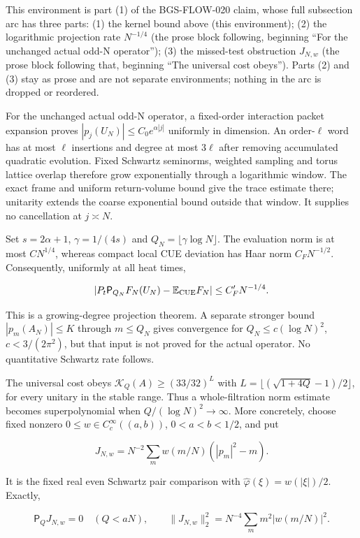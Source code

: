 This environment is part (1) of the BGS-FLOW-020 claim, whose full
subsection arc has three parts: (1) the kernel bound above (this
environment); (2) the logarithmic projection rate \(N^{-1/4}\) (the prose
block following, beginning ``For the unchanged actual odd-N
operator''); (3) the missed-test obstruction \(J_{N,w}\) (the prose
block following that, beginning ``The universal cost obeys''). Parts
(2) and (3) stay as prose and are not separate environments; nothing
in the arc is dropped or reordered.

For the unchanged actual odd-N operator, a fixed-order interaction
packet expansion proves \(|p_j(U_N)|\le C_0e^{\alpha|j|}\) uniformly
in dimension. An order-\(\ell\) word has at most \(\ell\) insertions and
degree at most \(3\ell\) after removing accumulated quadratic evolution.
Fixed Schwartz seminorms, weighted sampling and torus lattice overlap
therefore grow exponentially through a logarithmic window. The exact
frame and uniform return-volume bound give the trace estimate there;
unitarity extends the coarse exponential bound outside that window.
It supplies no cancellation at \(j\asymp N\).

Set \(s=2\alpha+1\), \(\gamma=1/(4s)\) and
\(Q_N=\lfloor\gamma\log N\rfloor\). The evaluation norm is at most
\(CN^{1/4}\), whereas compact local CUE deviation has Haar norm
\(C_FN^{-1/2}\). Consequently, uniformly at all heat times,

\[
|P_t\mathsf P_{Q_N}F_N(U_N)-\mathbb E_{\rm CUE}F_N|
\le C'_FN^{-1/4}.
\]

This is a growing-degree projection theorem. A separate stronger bound
\(|p_m(A_N)|\le K\) through \(m\le Q_N\) gives convergence for
\(Q_N\le c(\log N)^2\), \(c<3/(2\pi^2)\), but that input is not
proved for the actual operator. No quantitative Schwartz rate follows.

The universal cost obeys
\(\mathcal K_Q(A)\ge(33/32)^L\) with
\(L=\lfloor(\sqrt{1+4Q}-1)/2\rfloor\), for every unitary in the
stable range. Thus a whole-filtration norm estimate becomes
superpolynomial when \(Q/(\log N)^2\to\infty\).
More concretely, choose fixed nonzero
\(0\le w\in C_c^\infty((a,b))\), \(0<a<b<1/2\), and put

\[
J_{N,w}=N^{-2}\sum_mw(m/N)(|p_m|^2-m).
\]

It is the fixed real even Schwartz pair comparison with
\(\widehat\varphi(\xi)=w(|\xi|)/2\). Exactly,

\[
\mathsf P_QJ_{N,w}=0\quad(Q<aN),\qquad
\|J_{N,w}\|_2^2=N^{-4}\sum_m m^2|w(m/N)|^2.
\]

